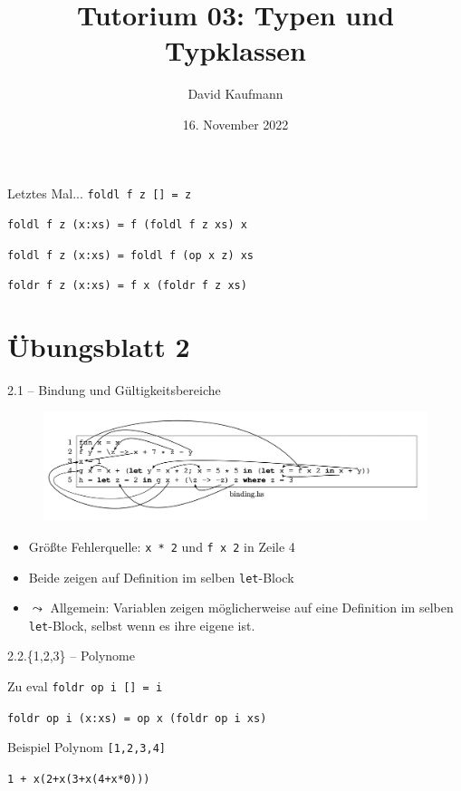 \documentclass{beamer}
\title{Tutorium 03: Typen und Typklassen}
\author{David Kaufmann}
\institute{Tutorium Programmierparadigmen am KIT}
\date{16. November 2022}
\begin{document}
\begin{frame}
	\titlepage
\end{frame}

\begin{frame}{Letztes Mal...}
    \texttt{foldl f z [] = z}
    
    \texttt{foldl f z (x:xs) = f (foldl f z xs) x}

    \bigskip

    \texttt{foldl f z (x:xs) = foldl f (op x z) xs}

    \bigskip

    \texttt{foldr f z (x:xs) = f x (foldr f z xs)}
\end{frame}

\section{Übungsblatt 2}

\begin{frame}{2.1 -- Bindung und Gültigkeitsbereiche}
    \begin{figure}
        \includegraphics[width=\textwidth]{images/binding.png}
    \end{figure}

    \begin{itemize}
        \item Größte Fehlerquelle: \texttt{x * 2} und \texttt{f x 2} in Zeile 4
        \item Beide zeigen auf Definition im selben \texttt{let}-Block
        \item $\leadsto$ Allgemein: Variablen zeigen möglicherweise auf eine Definition im selben \texttt{let}-Block, selbst wenn es ihre eigene ist.
    \end{itemize}
\end{frame}

\begin{frame}{2.2.\{1,2,3\} -- Polynome}
\end{frame}

\begin{frame}{Zu eval}
    \texttt{foldr op i [] = i}

    \texttt{foldr op i (x:xs) = op x (foldr op i xs)}

    \bigskip
    
    Beispiel Polynom \texttt{[1,2,3,4]}

    \texttt{1 + x(2+x(3+x(4+x*0)))}

    
\end{frame}
\end{document}
